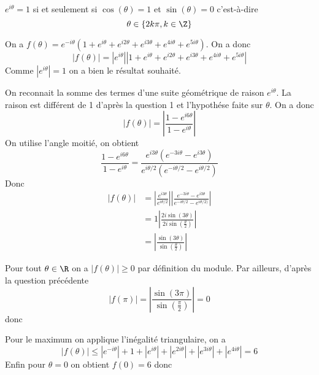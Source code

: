 \begin{correction}
$e^{i\theta}=1$ si et seulement si $\cos(\theta) = 1 $ et $\sin(\theta) =0$ c'est-à-dire 
$$\theta \in \{ 2k\pi , k \in \Z\}$$

On a $f(\theta) = e^{-i\theta} (1+e^{i \theta}+e^{i2 \theta}+e^{i3 \theta}+e^{4i \theta}+e^{5i \theta})$. On a donc 
$$|f(\theta)|=|e^{i\theta}| \left| 1+e^{i \theta}+e^{i2 \theta}+e^{i3 \theta}+e^{4i \theta}+e^{5i \theta}\right|$$
Comme $|e^{i\theta}| =1$ on a bien le résultat souhaité. 

On reconnait la somme des termes d'une suite géométrique de raison $e^{i\theta}$. La raison est différent de 1 d'après la question 1 et l'hypothése faite sur $\theta $.  On a donc 
$$\left| f(\theta)\right| =\left| \frac{1-e^{i6\theta}}{1-e^{i\theta}}\right|$$
On utilise l'angle moitié, on obtient 
$$ \frac{1-e^{i6\theta}}{1-e^{i\theta}} = \frac{e^{i3\theta}(e^{-3i\theta}-e^{i3\theta})}{e^{i\theta/2}(e^{-i\theta/2}-e^{i\theta/2})} $$
Donc 
\begin{align*}
\left| f(\theta)\right| &= \left| \frac{e^{i3\theta}}{e^{i\theta/2}} \right| \left|\frac{e^{-3i\theta}-e^{i3\theta}}{e^{-i\theta/2}-e^{i\theta/2)}}\right|\\
								&=1\left|\frac{2i \sin(3\theta)}{2i\sin(\frac{\theta}{2})}\right|\\
	&=\left| \frac{\sin(3\theta)}{\sin(\frac{\theta}{2})}\right|						
\end{align*}

Pour tout $\theta \in \R$ on a $|f(\theta)| \geq 0$ par définition du module. Par ailleurs, d'après la question précédente 
$$\left| f(\pi)\right|= \left| \frac{\sin(3\pi)}{\sin(\frac{\pi}{2})}\right|	=0$$
donc 
\begin{center}
\end{center}

Pour le maximum on applique l'inégalité triangulaire, on a 
$$\left| f(\theta)\right| \leq \left| e^{-i\theta}\right| + 1+\left| e^{i\theta}\right| + \left| e^{2i\theta}\right| + \left| e^{3i\theta}\right| + \left| e^{4i\theta}\right|=6$$
Enfin pour $\theta=0$ on obtient $f(0)=6$ donc 
\begin{center}
\end{center}

\end{correction}